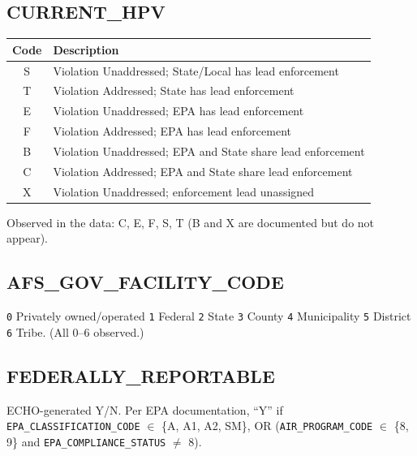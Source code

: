 \documentclass[11pt]{article}
\begin{document}
\subsection*{CURRENT\_HPV}
\begin{longtable}{C E}
\toprule
Code & Description \\ \midrule \endhead
S & Violation Unaddressed; State/Local has lead enforcement \\
T & Violation Addressed; State has lead enforcement \\
E & Violation Unaddressed; EPA has lead enforcement \\
F & Violation Addressed; EPA has lead enforcement \\
B & Violation Unaddressed; EPA and State share lead enforcement \\
C & Violation Addressed; EPA and State share lead enforcement \\
X & Violation Unaddressed; enforcement lead unassigned \\
\bottomrule
\end{longtable}
\noindent Observed in the data: C, E, F, S, T (B and X are documented but do not appear).

\subsection*{AFS\_GOV\_FACILITY\_CODE}
\texttt{0} Privately owned/operated \textbar{} \texttt{1} Federal \textbar{} \texttt{2} State \textbar{}
\texttt{3} County \textbar{} \texttt{4} Municipality \textbar{} \texttt{5} District \textbar{}
\texttt{6} Tribe. (All 0--6 observed.)

\subsection*{FEDERALLY\_REPORTABLE}
ECHO-generated Y/N. Per EPA documentation, ``Y'' if \texttt{EPA\_CLASSIFICATION\_CODE} $\in$
\{A, A1, A2, SM\}, OR (\texttt{AIR\_PROGRAM\_CODE} $\in$ \{8, 9\} and \texttt{EPA\_COMPLIANCE\_STATUS}
$\neq$ 8).
\end{document}
